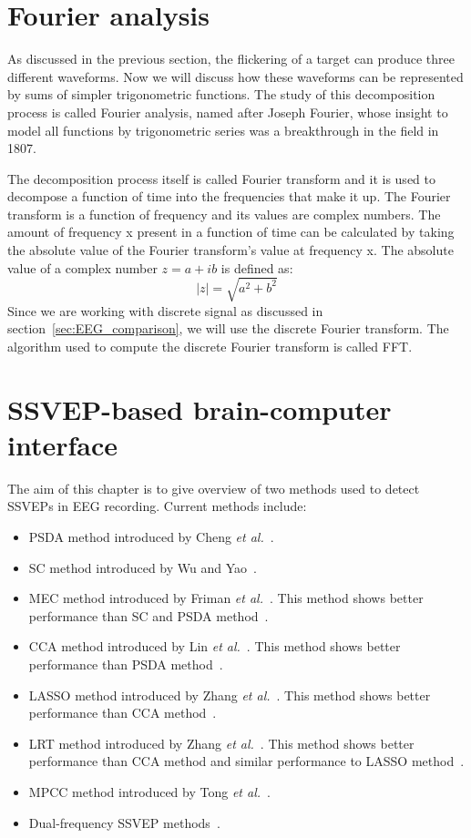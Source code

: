 \section{Fourier analysis}

As discussed in the previous section, the flickering of a target can produce three different waveforms. Now we will discuss how these waveforms can be represented by sums of simpler trigonometric functions. The study of this decomposition process is called Fourier analysis, named after Joseph Fourier, whose insight to model all functions by trigonometric series was a breakthrough in the field in 1807.

The decomposition process itself is called Fourier transform and it is used to decompose a function of time into the frequencies that make it up. The Fourier transform is a function of frequency and its values are complex numbers. The amount of frequency x present in a function of time can be calculated by taking the absolute value of the Fourier transform's value at frequency x. The absolute value of a complex number $z=a+ib$ is defined as:
\begin{equation}
	|z|=\sqrt{a^2+b^2}
\end{equation}
Since we are working with discrete signal as discussed in section~\ref{sec:EEG_comparison}, we will use the discrete Fourier transform. The algorithm used to compute the discrete Fourier transform is called \gls{FFT}.

\section{SSVEP-based brain-computer interface}
\label{sec:SSVEP_detection}
The aim of this chapter is to give overview of two methods used to detect \glspl{SSVEP} in \gls{EEG} recording. Current methods include:
\begin{itemize}
	\item \Gls{PSDA} method introduced by Cheng \emph{et al.}~\cite{psda}.
	\item \Gls{SC} method introduced by Wu and Yao~\cite{sc}.
	\item \Gls{MEC} method introduced by Friman \emph{et al.}~\cite{mec}. This method shows better performance than \gls{SC} and \gls{PSDA} method~\cite{mec_comparison}.
	\item \Gls{CCA} method introduced by Lin \emph{et al.}~\cite{cca_lin}. This method shows better performance than \gls{PSDA} method~\cite{bin2009cca}.
	\item \Gls{LASSO} method introduced by Zhang \emph{et al.}~\cite{LASSO}. This method shows better performance than \gls{CCA} method~\cite{LASSO}.
	\item \Gls{LRT} method introduced by Zhang \emph{et al.}~\cite{LRT}. This method shows better performance than \gls{CCA} method and similar performance to \gls{LASSO} method~\cite{LRT}.
	\item \Gls{MPCC} method introduced by Tong \emph{et al.}~\cite{MPCC}.
	\item Dual-frequency \gls{SSVEP} methods~\cite{dual1, dual2}.
\end{itemize}

